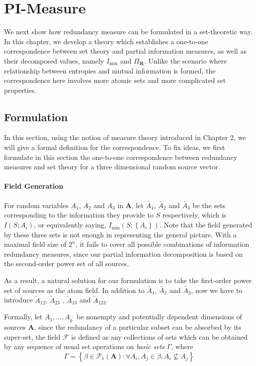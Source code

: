 \section{PI-Measure}

We next show how redundancy measure can be formulated in a set-theoretic way. In this chapter, we develop a theory which establishes a one-to-one correspondence between set theory and partial information measures, as well as their decomposed values, namely $I_{\min}$ and $\Pi_{\mathbf{R}}$. Unlike the scenario where relationship between entropies and mutual information is formed, the correspondence here involves more atomic sets and more complicated set properties.

\subsection{Formulation}

In this section, using the notion of measure theory introduced in Chapter 2, %
we will give a formal definition for the correspondence. To fix ideas, we first formulate in this section the one-to-one correspondence between redundancy measures and set theory for a three dimensional random source vector.

\paragraph{Field Generation}
For random variables $A_1$, $A_2$ and $A_3$ in $\mathbf{A}$, let $\tilde{A_1}$, $\tilde{A_2}$ and $\tilde{A_3}$ be the sets corresponding to the information they provide to $S$ respectively, which is $I\left(S;A_i\right)$, or equivalently saying,  $I_{\min}\left(S;\left\{A_i\right\}\right)$. Note that the field generated by these three sets is not enough in representing the general picture. With a maximal field size of $2^n$, it fails to cover all possible combinations of information redundancy measures, since our partial information decomposition is based on the second-order power set of all sources.

As a result, a natural solution for our formulation is to take the first-order power set of sources as the atom field. In addition to $\tilde{A_1}$, $\tilde{A_2}$ and $\tilde{A_3}$, now we have to introduce $\tilde{A}_{12}$, $\tilde{A}_{23}$ , $\tilde{A}_{13}$ and $\tilde{A}_{123}$.

Formally, let $A_1,\ldots,A_{k^{'}}$ be nonempty and potentially dependent dimensions of sources $\mathbf{A}$. since the redundancy of a particular subset can be absorbed by its super-set, the field $\mathcal{F}$ is defined as any collections of sets which can be obtained by any sequence of usual set operations on \textit{basic sets} $\Gamma$, where 
\begin{equation}
    \Gamma = \left\{ \beta \in \mathcal{P}_{1}(\mathbf{A}) : \forall A_i,A_j \in \beta, {A}_i \nsubseteq {A}_j \right\}
\end{equation}

